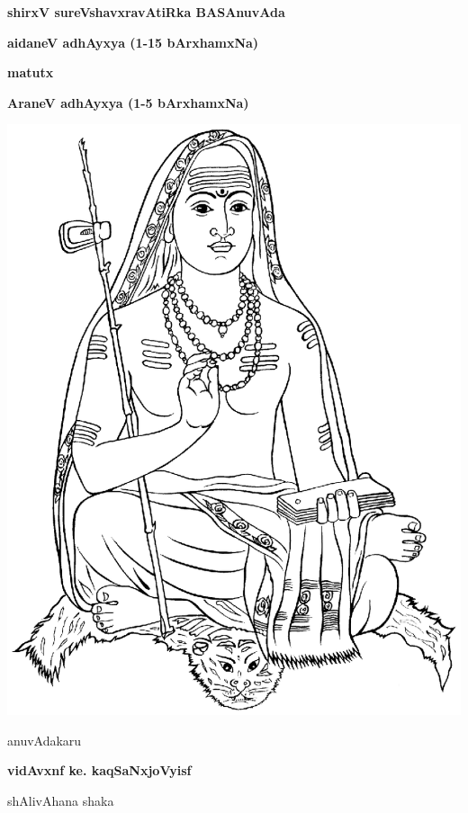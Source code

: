 \thispagestyle{empty}
\begin{center}
{\Huge\bfseries shirxV sureVshavxravAtiRka BASAnuvAda}
\bigskip

{\large\bfseries aidaneV adhAyxya (1-15 bArxhamxNa)}
\smallskip

{\large\bfseries matutx}
\smallskip

{\large\bfseries AraneV adhAyxya (1-5 bArxhamxNa)}
\bigskip

\vfill

\includegraphics[scale=0.7]{figures/shankaracharya.eps}

\vfill

anuvAdakaru
\smallskip

{\large\bfseries vidAvxnf ke. kaqSaNxjoVyisf}

\smallskip
shAlivAhana shaka

\end{center}
